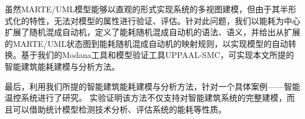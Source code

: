 	虽然MARTE/UML模型能够以直观的形式实现系统的多视图建模，但由于其半形式化的特性，无法对模型的属性进行验证、评估。针对此问题，我们以能耗为中心扩展了随机混成自动机，定义了能耗随机混成自动机的语法、语义，并给出从扩展的MARTE/UML状态图到能耗随机混成自动机的映射规则，以实现模型的自动转换。基于我们的Modana工具和模型验证工具UPPAAL-SMC，可实现本文所提的智能建筑能耗建模与分析方法。
	
	最后，利用我们所提的智能建筑能耗建模与分析方法，针对一个具体案例——智能温控系统进行了研究。
	实验证明该方法不仅支持对智能建筑系统的完整建模，而且可以借助统计模型检测技术分析、评估系统的能耗等性质。
	

\hspace{-0.5cm}
 
